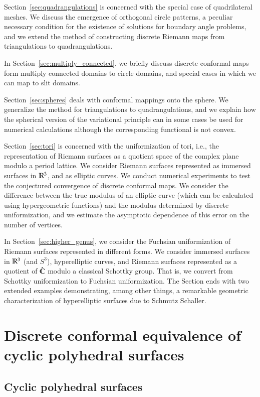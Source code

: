 \documentclass[Thesis]{subfiles}
\begin{document}
Section~\ref{sec:quadrangulations} is concerned with the special case
of quadrilateral meshes. We discuss the emergence of
orthogonal circle patterns, a peculiar necessary condition for the
existence of solutions for boundary angle problems, and we extend the
method of constructing discrete Riemann maps from triangulations to
quadrangulations.

In Section~\ref{sec:multiply_connected}, we briefly discuss discrete
conformal maps form multiply connected domains to circle domains, and
special cases in which we can map to slit domains. 

Section~\ref{sec:spheres} deals with conformal mappings onto the
sphere. We generalize the method for triangulations to
quadrangulations, and we explain how the spherical version of the
variational principle can in some cases be used for numerical
calculations although the corresponding functional is not convex.

Section~\ref{sec:tori} is concerned with the uniformization of tori,
i.e., the representation of Riemann surfaces as a quotient space of
the complex plane modulo a period lattice. We consider Riemann
surfaces represented as immersed surfaces in $\mathbb R^{3}$, and as elliptic
curves. We conduct numerical experiments to test the conjectured
convergence of discrete conformal maps. We consider the difference
between the true modulus of an elliptic curve (which can be calculated
using hypergeometric functions) and the modulus determined by discrete
uniformization, and we estimate the asymptotic dependence of this
error on the number of vertices.

In Section~\ref{sec:higher_genus}, we consider the Fuchsian
uniformization of Riemann surfaces represented in different forms. We
consider immersed surfaces in $\mathbb R^{3}$ (and $S^{3}$), hyperelliptic
curves, and Riemann surfaces represented as a quotient of $\hat{\mathbb C}$
modulo a classical Schottky group. That is, we convert from Schottky
uniformization to Fuchsian uniformization. The Section ends with two
extended examples demonstrating, among other things, a remarkable
geometric characterization of hyperelliptic surfaces due to Schmutz
Schaller.

\section{Discrete conformal equivalence of cyclic polyhedral surfaces}
\label{sec:basic_definitions}

\subsection{Cyclic polyhedral surfaces }
\end{document}
